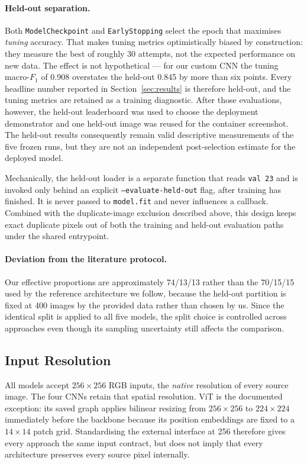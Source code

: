 \documentclass[11pt,twoside,a4paper]{article}
\begin{document}
\paragraph{Held-out separation.}
Both \texttt{ModelCheckpoint} and \texttt{EarlyStopping} select the epoch that
maximises \emph{tuning} accuracy. That makes tuning metrics optimistically
biased by construction: they measure the best of roughly 30 attempts, not the
expected performance on new data. The effect is not hypothetical --- for our
custom CNN the tuning macro-$F_1$ of 0.908 overstates the held-out 0.845 by
more than six points. Every headline number reported in
Section~\ref{sec:results} is therefore held-out, and the tuning metrics are
retained as a training diagnostic. After those evaluations, however, the
held-out leaderboard was used to choose the deployment demonstrator and one
held-out image was reused for the container screenshot. The held-out results
consequently remain valid descriptive measurements of the five frozen runs,
but they are not an independent post-selection estimate for the deployed
model.

Mechanically, the held-out loader is a separate function that reads
\texttt{val 23} and is invoked only behind an explicit
\texttt{--evaluate-held-out} flag, after training has finished. It is never
passed to \texttt{model.fit} and never influences a callback. Combined with the
duplicate-image exclusion described above, this design keeps exact duplicate
pixels out of both the training and held-out evaluation paths under the shared
entrypoint.

\paragraph{Deviation from the literature protocol.}
Our effective proportions are approximately 74/13/13 rather than the 70/15/15
used by the reference architecture we follow, because the held-out partition is
fixed at 400 images by the provided data rather than chosen by us. Since the
identical split is applied to all five models, the split choice is controlled
across approaches even though its sampling uncertainty still affects the
comparison.
\subsection{Input Resolution}

All models accept $256 \times 256$ RGB inputs, the \emph{native} resolution of
every source image. The four CNNs retain that spatial resolution. ViT is the
documented exception: its saved graph applies bilinear resizing from
$256 \times 256$ to $224 \times 224$ immediately before the backbone because
its position embeddings are fixed to a $14 \times 14$ patch grid. Standardising
the external interface at 256 therefore gives every approach the same input
contract, but does not imply that every architecture preserves every source
pixel internally.
\end{document}
